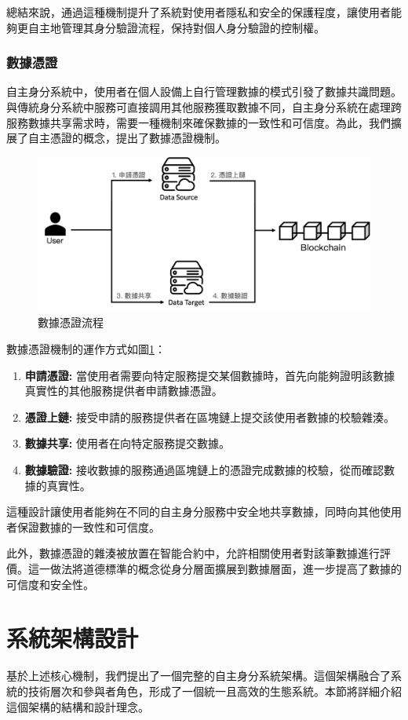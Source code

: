 總結來說，通過這種機制提升了系統對使用者隱私和安全的保護程度，讓使用者能夠更自主地管理其身分驗證流程，保持對個人身分驗證的控制權。
\subsubsection{數據憑證}
自主身分系統中，使用者在個人設備上自行管理數據的模式引發了數據共識問題。與傳統身分系統中服務可直接調用其他服務獲取數據不同，自主身分系統在處理跨服務數據共享需求時，需要一種機制來確保數據的一致性和可信度。為此，我們擴展了自主憑證的概念，提出了數據憑證機制。
\begin{figure}
  \centering
  \includegraphics[width=\linewidth,keepaspectratio]{figures/flow-dc.png}
  \caption{數據憑證流程}
  \label{fig:flow-dc}
\end{figure}
數據憑證機制的運作方式如圖\ref{fig:flow-dc}：
\begin{enumerate}
  \item \textbf{申請憑證:} 當使用者需要向特定服務提交某個數據時，首先向能夠證明該數據真實性的其他服務提供者申請數據憑證。
  \item \textbf{憑證上鏈:} 接受申請的服務提供者在區塊鏈上提交該使用者數據的校驗雜湊。
  \item \textbf{數據共享:} 使用者在向特定服務提交數據。
  \item \textbf{數據驗證:} 接收數據的服務通過區塊鏈上的憑證完成數據的校驗，從而確認數據的真實性。
\end{enumerate}
這種設計讓使用者能夠在不同的自主身分服務中安全地共享數據，同時向其他使用者保證數據的一致性和可信度。

此外，數據憑證的雜湊被放置在智能合約中，允許相關使用者對該筆數據進行評價。這一做法將道德標準的概念從身分層面擴展到數據層面，進一步提高了數據的可信度和安全性。
\section{系統架構設計}
基於上述核心機制，我們提出了一個完整的自主身分系統架構。這個架構融合了系統的技術層次和參與者角色，形成了一個統一且高效的生態系統。本節將詳細介紹這個架構的結構和設計理念。
